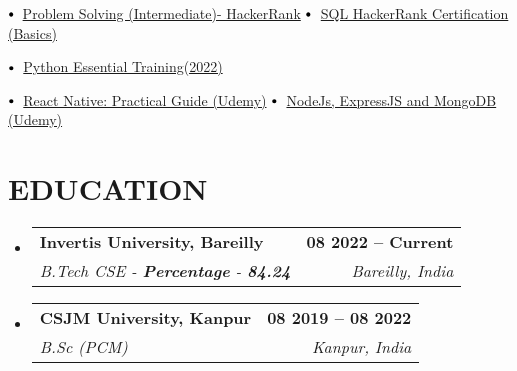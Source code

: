 \documentclass[letterpaper,11pt]{article}
\makeatletter
\newcommand{\resumeSubheading}[4]{
  \vspace{-2pt}\item
    \begin{tabular*}{1.0\textwidth}[t]{l@{\extracolsep{\fill}}r}
      \textbf{\large#1} & \textbf{\small #2} \\
      \textit{\large#3} & \textit{\small #4} \\
     
    \end{tabular*}\vspace{-7pt}
}
\newcommand{\resumeSubHeadingListStart}{\begin{itemize}[leftmargin=0.0in, label={}]}
\newcommand{\resumeSubHeadingListEnd}{\end{itemize}}
\newcommand\sbullet[1][.5]{\mathbin{\vcenter{\hbox{\scalebox{#1}{$\bullet$}}}}}
\makeatother
\begin{document}
$\sbullet[.75] \hspace{0.2cm}${\href{https://www.hackerrank.com/certificates/90e93a3ef140}{Problem Solving (Intermediate)- HackerRank}} \hspace{1cm}
$\sbullet[.75] \hspace{0.1cm}$ {\href{https://www.hackerrank.com/certificates/0c8ab9e2960a}{SQL HackerRank Certification (Basics)}} \hspace{2.6cm}

$\sbullet[.75] \hspace{0.1cm}$ {\href{https://drive.google.com/file/d/1S1wRK5fm6CGY2MXcZqkmtFNMBcgmcdo4/view?usp=drive_link}{Python Essential Training(2022)}} \hspace{2.6cm}

$\sbullet[.75] \hspace{0.1cm}$ {\href{}{React Native: Practical Guide (Udemy)}} \hspace{2.6cm}
$\sbullet[.75] \hspace{0.1cm}$ {\href{}{NodeJs, ExpressJS and MongoDB (Udemy)}} \hspace{2.6cm}

\section{EDUCATION}
  \resumeSubHeadingListStart
    \resumeSubheading
      {Invertis University, Bareilly}{08 2022 -- Current}
      {B.Tech CSE - \textbf{Percentage} - \textbf{84.24}}{Bareilly, India}
  \resumeSubHeadingListEnd
 
  \resumeSubHeadingListStart
    \resumeSubheading
      {CSJM University, Kanpur}{08 2019 -- 08 2022}
      {B.Sc (PCM)\textbf \textbf{}}{Kanpur, India}
  \resumeSubHeadingListEnd
\end{document}
